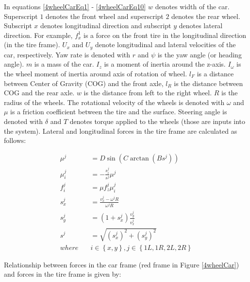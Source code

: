 \documentclass[paper=a4, fontsize=11pt]{scrartcl} %
\numberwithin{equation}{section} %
\numberwithin{figure}{section} %
\numberwithin{table}{section} %
\begin{document}
In equations \ref{4wheelCarEq1} - \ref{4wheelCarEq10} $w$ denotes width of the car. Superscript $1$ denotes the front wheel and superscript $2$ denotes the rear wheel. Subscript $x$ denotes longitudinal direction and subscript $y$ denotes lateral direction. For example, $f^1_x$ is a force on the front tire in the longitudinal direction (in the tire frame). $U_x$ and $U_y$ denote longitudinal and lateral velocities of the car, respectively. Yaw rate is denoted with $r$ and $\psi$ is the yaw angle (or heading angle). 
$m$ is a mass of the car.
$I_z$ is a moment of inertia around the z-axis.
$I_\omega$ is the wheel moment of inertia around axis of rotation of wheel.
$l_F$ is a distance between Center of Gravity (COG) and the front axle, $l_R$ is the distance between COG and the rear axle. $w$ is the distance from left to the right wheel. $R$ is the radius of the wheels. The rotational velocity of the wheels is denoted with $\omega$ and $\mu$ is a friction coefficient between the tire and the surface. Steering angle is denoted with $\delta$ and $T$ denotes torque applied to the wheels (those are inputs into the system). Lateral and longitudinal forces in the tire frame are calculated as follows:

\begin{align}
\mu^j & =D\sin(C\arctan(Bs^j)) \label{4wheelPacejkaEq1}  \\
\mu_i^j & = -\frac{s_i^j}{s^j}\mu^j   \\
f_i^j & = \mu f_{z}^j \mu_i^j \label{lateralLongitudinal}  \\
s_x^j & = \frac{v_x^j - \omega^jR}{\omega^jR}   \\
s_y^j & = \left( 1 + s_x^j\right) \frac{v_y^j}{v_x^j}  \\ 
s^j & = \sqrt{ (s_x^j)^2 + (s_y^j)^2 }   \\
where \quad &  i \in\left\{ {x, y}\right\}, j \in \left\{ {1L,1R,2L, 2R}\right\} \label{4wheelPacejkaEq6}
\end{align}

Relationship between forces in the car frame (red frame in Figure \ref{4wheelCar}) and forces in the tire frame is given by:
\end{document}
